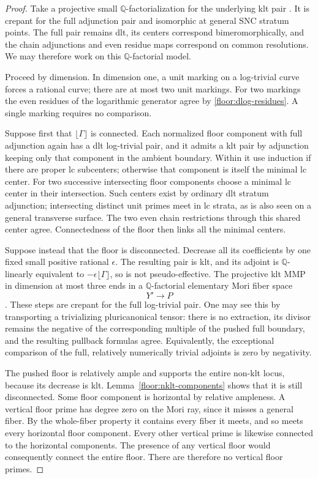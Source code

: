 \documentclass[11pt,letterpaper]{article}
\theoremstyle{definition}
\theoremstyle{remark}
\begin{document}
\begin{proof}
Take a projective small $\mathbb{Q}$-factorialization for the
underlying klt pair \cite{BCHM}.  It is crepant for the full
adjunction pair and isomorphic at general SNC stratum
points.  The full pair remains dlt, its centers correspond
bimeromorphically, and the chain adjunctions and even residue
maps correspond on common resolutions.  We may therefore
work on this $\mathbb{Q}$-factorial model.

Proceed by dimension.  In dimension one, a unit marking on
a log-trivial curve forces a rational curve; there are at
most two unit markings.  For two markings the even residues
of the logarithmic generator agree by
\eqref{floor:dlog-residues}.  A single marking requires no
comparison.

Suppose first that $\lfloor\Gamma\rfloor$ is connected.
Each normalized floor component with full adjunction again
has a dlt log-trivial pair, and it admits a klt pair by
adjunction keeping only that component in the ambient
boundary.  Within it use induction if there are proper
lc subcenters; otherwise that component is itself the
minimal lc center.  For two successive intersecting floor
components choose a minimal lc center in their intersection.
Such centers exist by ordinary dlt stratum adjunction;
intersecting distinct unit primes meet in lc strata, as is
also seen on a general transverse surface.  The two even
chain restrictions through this shared center agree.
Connectedness of the floor then links all the minimal
centers.

Suppose instead that the floor is disconnected.  Decrease
all its coefficients by one fixed small positive rational
$\epsilon$.  The resulting pair is klt, and its adjoint
is $\mathbb{Q}$-linearly equivalent to
$-\epsilon\lfloor\Gamma\rfloor$, so is not
pseudo-effective.  The projective klt MMP in dimension at
most three ends in a $\mathbb{Q}$-factorial elementary Mori fiber
space
\[
 Y'\longrightarrow P
\]
\cite{ThreefoldFlipsAbundance,BCHM}.  These steps are
crepant for the full log-trivial pair.  One may see this
by transporting a trivializing pluricanonical tensor:
there is no extraction, its divisor remains the negative
of the corresponding multiple of the pushed full boundary,
and the resulting pullback formulas agree.  Equivalently,
the exceptional comparison of the full, relatively
numerically trivial adjoints is zero by negativity.

The pushed floor is relatively ample and supports the
entire non-klt locus, because its decrease is klt.
Lemma~\ref{floor:nklt-components} shows that it is still
disconnected.  Some floor component is horizontal by
relative ampleness.  A vertical floor prime has degree
zero on the Mori ray, since it misses a general fiber.
By the whole-fiber property it contains every fiber it
meets, and so meets every horizontal floor component.
Every other vertical prime is likewise connected to the
horizontal components.  The presence of any vertical
floor would consequently connect the entire floor.
There are therefore no vertical floor primes.


\end{proof}
\end{document}
